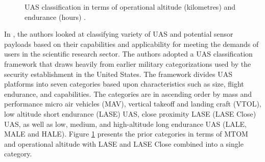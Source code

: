 \documentclass[english, 12pt, a4paper, elec, utf8, a-1b, online]{aaltothesis}
\begin{document}
\begin{figure}[h]
  \centering
  
  \caption{UAS classification in terms of operational altitude (kilometres) and endurance (hours) \cite{watts2012unmanned}.}
  \label{fig-3d-dhs-uas-classification}
\end{figure}

In \cite{watts2012unmanned}, the authors looked at classifying variety of UAS and potential sensor payloads based on their capabilities and applicability for meeting the demands of users in the scientific research sector.
The authors adopted a UAS classification framework that draws heavily from earlier military categorizations used by the security establishment in the United States.
The framework divides UAS platforms into seven categories based upon characteristics such as size, flight endurance, and capabilities.
The categories are in ascending order by mass and performance micro air vehicles (MAV), vertical takeoff and landing craft (VTOL), low altitude short endurance (LASE) UAS, close proximity LASE (LASE Close) UAS, as well as low, medium, and high-altitude long endurance UAS (LALE, MALE and HALE).
Figure \ref{fig-3d-dhs-uas-classification} presents the prior categories in terms of MTOM and operational altitude with LASE and LASE Close combined into a single category.
\end{document}
